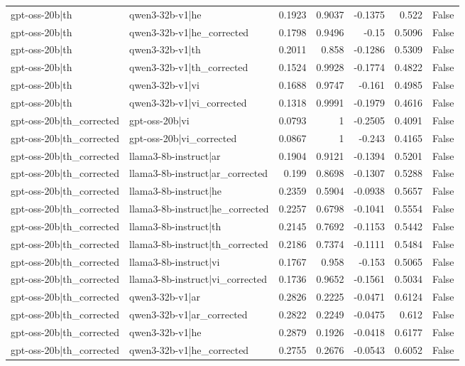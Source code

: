 \begin{table}
\begin{tabular}{l l r r r r l}
gpt-oss-20b|th & qwen3-32b-v1|he & 0.1923 & 0.9037 & -0.1375 & 0.522 & False \\
gpt-oss-20b|th & qwen3-32b-v1|he_corrected & 0.1798 & 0.9496 & -0.15 & 0.5096 & False \\
gpt-oss-20b|th & qwen3-32b-v1|th & 0.2011 & 0.858 & -0.1286 & 0.5309 & False \\
gpt-oss-20b|th & qwen3-32b-v1|th_corrected & 0.1524 & 0.9928 & -0.1774 & 0.4822 & False \\
gpt-oss-20b|th & qwen3-32b-v1|vi & 0.1688 & 0.9747 & -0.161 & 0.4985 & False \\
gpt-oss-20b|th & qwen3-32b-v1|vi_corrected & 0.1318 & 0.9991 & -0.1979 & 0.4616 & False \\
gpt-oss-20b|th_corrected & gpt-oss-20b|vi & 0.0793 & 1 & -0.2505 & 0.4091 & False \\
gpt-oss-20b|th_corrected & gpt-oss-20b|vi_corrected & 0.0867 & 1 & -0.243 & 0.4165 & False \\
gpt-oss-20b|th_corrected & llama3-8b-instruct|ar & 0.1904 & 0.9121 & -0.1394 & 0.5201 & False \\
gpt-oss-20b|th_corrected & llama3-8b-instruct|ar_corrected & 0.199 & 0.8698 & -0.1307 & 0.5288 & False \\
gpt-oss-20b|th_corrected & llama3-8b-instruct|he & 0.2359 & 0.5904 & -0.0938 & 0.5657 & False \\
gpt-oss-20b|th_corrected & llama3-8b-instruct|he_corrected & 0.2257 & 0.6798 & -0.1041 & 0.5554 & False \\
gpt-oss-20b|th_corrected & llama3-8b-instruct|th & 0.2145 & 0.7692 & -0.1153 & 0.5442 & False \\
gpt-oss-20b|th_corrected & llama3-8b-instruct|th_corrected & 0.2186 & 0.7374 & -0.1111 & 0.5484 & False \\
gpt-oss-20b|th_corrected & llama3-8b-instruct|vi & 0.1767 & 0.958 & -0.153 & 0.5065 & False \\
gpt-oss-20b|th_corrected & llama3-8b-instruct|vi_corrected & 0.1736 & 0.9652 & -0.1561 & 0.5034 & False \\
gpt-oss-20b|th_corrected & qwen3-32b-v1|ar & 0.2826 & 0.2225 & -0.0471 & 0.6124 & False \\
gpt-oss-20b|th_corrected & qwen3-32b-v1|ar_corrected & 0.2822 & 0.2249 & -0.0475 & 0.612 & False \\
gpt-oss-20b|th_corrected & qwen3-32b-v1|he & 0.2879 & 0.1926 & -0.0418 & 0.6177 & False \\
gpt-oss-20b|th_corrected & qwen3-32b-v1|he_corrected & 0.2755 & 0.2676 & -0.0543 & 0.6052 & False \\

\end{tabular}
\end{table}
